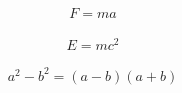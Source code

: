 \documentclass[border=0.1cm]{minimal}
\begin{document}
\begin{align*}
F=ma
\end{align*}

\begin{align*}
E = mc^2
\end{align*}

\begin{equation*}
a^2 -b^2 = (a-b)(a+b)    
\end{equation*}
\end{document}

